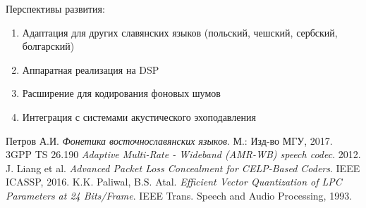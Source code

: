 \documentclass{report}
\begin{document}
	Перспективы развития:
	\begin{enumerate}
		\item Адаптация для других славянских языков (польский, чешский, сербский, болгарский)
		\item Аппаратная реализация на DSP
		\item Расширение для кодирования фоновых шумов
		\item Интеграция с системами акустического эхоподавления
	\end{enumerate}
	
	\begin{thebibliography}{9}
		 Петров А.И. \emph{Фонетика восточнославянских языков}. М.: Изд-во МГУ, 2017.
		 3GPP TS 26.190 \emph{Adaptive Multi-Rate - Wideband (AMR-WB) speech codec}. 2012.
		 J. Liang et al. \emph{Advanced Packet Loss Concealment for CELP-Based Coders}. IEEE ICASSP, 2016.
		 K.K. Paliwal, B.S. Atal. \emph{Efficient Vector Quantization of LPC Parameters at 24 Bits/Frame}. IEEE Trans. Speech and Audio Processing, 1993.
	\end{thebibliography}
	
\end{document}
